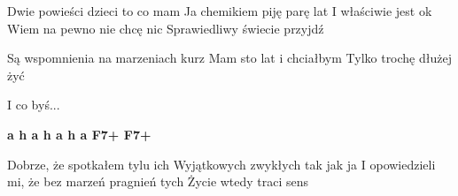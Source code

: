 \documentclass[../../../songbook.tex]{subfiles}
\begin{document}
Dwie powieści dzieci to co mam	 \newline
Ja chemikiem piję parę lat		 \newline
I właściwie jest ok			 \newline
Wiem na pewno nie chcę nic		 \newline
Sprawiedliwy świecie przyjdź		 \newline

Są wspomnienia na marzeniach kurz	  \newline
Mam sto lat i chciałbym			 \newline
Tylko trochę dłużej żyć 			 \newline

\-\hspace{1cm} I co byś... \newline

{\color{red}\textbf{a h a h a h a F7+ F7+} } \newline

Dobrze, że spotkałem tylu ich  			 \newline
Wyjątkowych zwykłych tak jak ja 		 \newline
I opowiedzieli mi, że bez marzeń pragnień tych	 \newline
Życie wtedy traci sens  	
\end{document}
